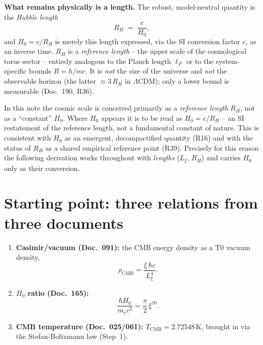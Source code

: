 \textbf{What remains physically is a length.} The robust, model-neutral
quantity is the \emph{Hubble length}
\begin{equation}
  R_H \;=\; \frac{c}{H_0},
  \label{eq:RH}
\end{equation}
and $H_0 = c/R_H$ is merely this length expressed, via the SI conversion factor
$c$, as an inverse time. $R_H$ is a \emph{reference length} -- the upper scale
of the cosmological torus sector -- entirely analogous to the Planck length
$\ell_P$ or to the system-specific bounds $R = \hbar/mc$. It is \emph{not} the
size of the universe and \emph{not} the observable horizon (the latter
$\approx 3\,R_H$ in $\Lambda$CDM); only a lower bound is measurable (Doc.~190,
R36).

\begin{foundation}
In this note the cosmic scale is conceived primarily as a \emph{reference
length} $R_H$, not as a \enquote{constant} $H_0$. Where $H_0$ appears it is to
be read as $H_0 = c/R_H$ -- an SI restatement of the reference length, not a
fundamental constant of nature. This is consistent with $H_0$ as an emergent,
decompactified quantity (R16) and with the status of $R_H$ as a shared
empirical reference point (R39). Precisely for this reason the following
derivation works throughout with \emph{lengths} ($L_\xi$, $R_H$) and carries
$H_0$ only as their conversion.
\end{foundation}

\section{Starting point: three relations from three documents}

\begin{foundation}
\begin{enumerate}
  \item \textbf{Casimir/vacuum (Doc.~091):} the CMB energy density as a T0
        vacuum density,
        \begin{equation}
          \rho_\text{CMB} = \frac{\xi\,\hbar c}{L_\xi^4}.
          \label{eq:rhocmb}
        \end{equation}
  \item \textbf{$H_0$ ratio (Doc.~165):}
        \begin{equation}
          \frac{\hbar H_0}{m_e c^2} = \frac{\pi}{2}\,\xi^{10}.
          \label{eq:h0}
        \end{equation}
  \item \textbf{CMB temperature (Doc.~025/061):} $T_\text{CMB}=2.72548$\,K,
        brought in via the Stefan-Boltzmann law (Step~1).
\end{enumerate}
\end{foundation}

